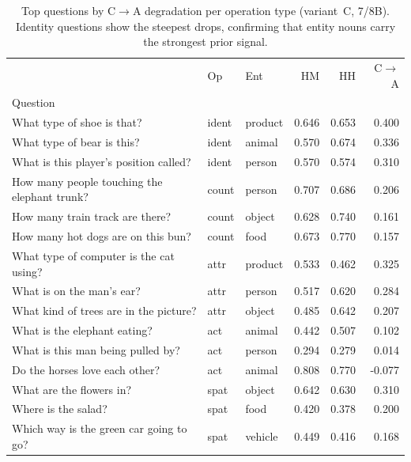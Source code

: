 \begin{table}[t]
\centering
\caption{Top questions by C$\to$A degradation per operation type (variant~C, 7/8B). Identity questions show the steepest drops, confirming that entity nouns carry the strongest prior signal.}
\label{tab:qual_op}
\small
\begin{tabular}{lllrrr}
\toprule
 & Op & Ent & HM & HH & C$\to$A \\
Question &  &  &  &  &  \\
\midrule
What type of shoe is that? & ident & product & 0.646 & 0.653 & 0.400 \\
What type of bear is this? & ident & animal & 0.570 & 0.674 & 0.336 \\
What is this player's position called? & ident & person & 0.570 & 0.574 & 0.310 \\
How many people touching the elephant trunk? & count & person & 0.707 & 0.686 & 0.206 \\
How many train track are there? & count & object & 0.628 & 0.740 & 0.161 \\
How many hot dogs are on this bun? & count & food & 0.673 & 0.770 & 0.157 \\
What type of computer is the cat using? & attr & product & 0.533 & 0.462 & 0.325 \\
What is on the man's ear? & attr & person & 0.517 & 0.620 & 0.284 \\
What kind of trees are in the picture? & attr & object & 0.485 & 0.642 & 0.207 \\
What is the elephant eating? & act & animal & 0.442 & 0.507 & 0.102 \\
What is this man being pulled by? & act & person & 0.294 & 0.279 & 0.014 \\
Do the horses love each other? & act & animal & 0.808 & 0.770 & -0.077 \\
What are the flowers in? & spat & object & 0.642 & 0.630 & 0.310 \\
Where is the salad? & spat & food & 0.420 & 0.378 & 0.200 \\
Which way is the green car going to go? & spat & vehicle & 0.449 & 0.416 & 0.168 \\
\bottomrule
\end{tabular}
\end{table}
